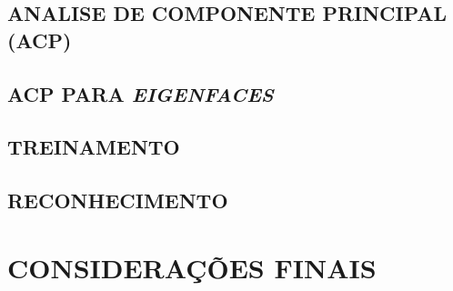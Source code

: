 \subsection{ANALISE DE COMPONENTE PRINCIPAL (ACP)}\label{subsec:acp}


\subsection{ACP PARA \textit{EIGENFACES}}\label{subsec:acp-eigen}

\subsection{TREINAMENTO}\label{subsec:treiamento}

\subsection{RECONHECIMENTO}\label{subsec:reconhecimento}



\section{CONSIDERAÇÕES FINAIS}\label{sec:revbib_consid_finais}






















